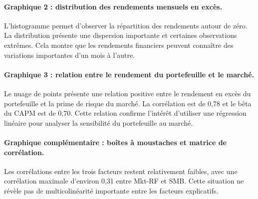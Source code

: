 \documentclass[12pt,a4paper]{article}
\begin{document}

\paragraph{Graphique 2 : distribution des rendements mensuels en excès.}
L'histogramme permet d'observer la répartition des rendements autour de zéro. La distribution présente une dispersion importante et certaines observations extrêmes. Cela montre que les rendements financiers peuvent connaître des variations importantes d'un mois à l'autre.


\paragraph{Graphique 3 : relation entre le rendement du portefeuille et le marché.}
Le nuage de points présente une relation positive entre le rendement en excès du portefeuille et la prime de risque du marché. La corrélation est de 0,78 et le bêta du CAPM est de 0,70. Cette relation confirme l'intérêt d'utiliser une régression linéaire pour analyser la sensibilité du portefeuille au marché.


\paragraph{Graphique complémentaire : boîtes à moustaches et matrice de corrélation.}
Les corrélations entre les trois facteurs restent relativement faibles, avec une corrélation maximale d'environ 0,31 entre Mkt-RF et SMB. Cette situation ne révèle pas de multicolinéarité importante entre les facteurs explicatifs.
\end{document}
